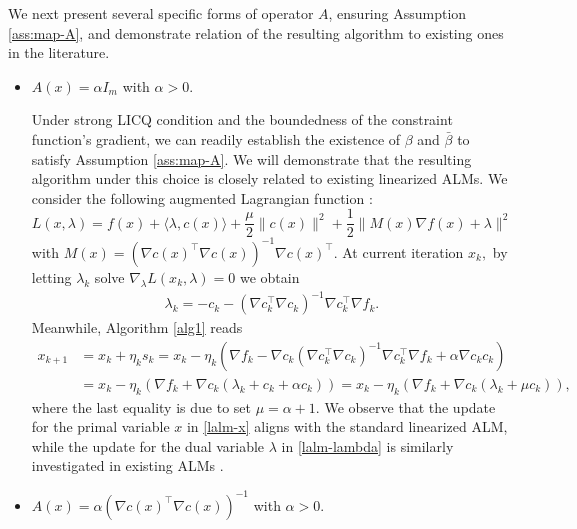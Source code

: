 \documentclass[11pt]{article}
\newcommand{\R}{\mathbb{R}}
\newcommand{\be}{\begin{equation}}
\newcommand{\ee}{\end{equation}}
\begin{document}
We next present several specific forms of operator $A$, ensuring Assumption \ref{ass:map-A}, and 
demonstrate relation of the resulting algorithm to existing ones in the literature.
\begin{itemize}
    \item \(A(x) = \alpha I_m\) with $\alpha>0$.
    
    Under strong LICQ condition and the boundedness of the constraint function's gradient, we can readily establish the existence of $\beta$ and $\bar\beta$ to satisfy Assumption \ref{ass:map-A}. We will demonstrate that the resulting  algorithm under this choice is closely related to existing  linearized ALMs. We consider the following augmented Lagrangian function \cite[Section 4.3.2]{bertsekas2014constrained}:
    \[
    L(x,\lambda) = f(x) + \langle \lambda, c(x) \rangle + \frac{\mu}{2}\|c(x)\|^2 + \frac{1}{2}\|M(x)\nabla f(x) + \lambda\|^2
    \]
    with
    $
    M(x) = (\nabla c(x)^{\top} \nabla c(x))^{-1} \nabla c(x)^{\top}.
    $ 
    At current iteration $x_k,$ 
    by letting $\lambda_k$ solve \(\nabla_\lambda L(x_k,\lambda)= 0\) we obtain
    \be\begin{aligned}\label{lalm-lambda}
    \lambda_k = - c_k - (\nabla c_k^{\top} \nabla c_k)^{-1} \nabla c_k^{\top} \nabla f_k.
    \end{aligned}\ee
    Meanwhile, Algorithm \ref{alg1} reads
    \be\begin{aligned}\label{lalm-x}
        x_{k+1} &= x_k + \eta_k s_k = x_k - \eta_k \left( \nabla f_k - \nabla c_k (\nabla c_k^{\top} \nabla c_k)^{-1} \nabla c_k^{\top} \nabla f_k + \alpha \nabla c_k c_k\right)\\
        &= x_k - \eta_k \left( \nabla f_k + \nabla c_k (\lambda_k + c_k + \alpha c_k)\right) = x_k - \eta_k \left( \nabla f_k + \nabla c_k (\lambda_k +\mu c_k)\right),
    \end{aligned}\ee
    where the last equality is due to set \(\mu = \alpha + 1\). We observe that the update for the primal variable $x$ in \eqref{lalm-x} aligns with the standard linearized ALM, while the update for the dual variable $\lambda$ in \eqref{lalm-lambda} is similarly investigated in existing ALMs \cite{wang2015augmented,wang2015augmented2}.

    \item \(A(x) = \alpha (\nabla c(x)^{\top} \nabla c(x))^{-1}\) with $\alpha>0$.
    

\end{itemize}
\end{document}
